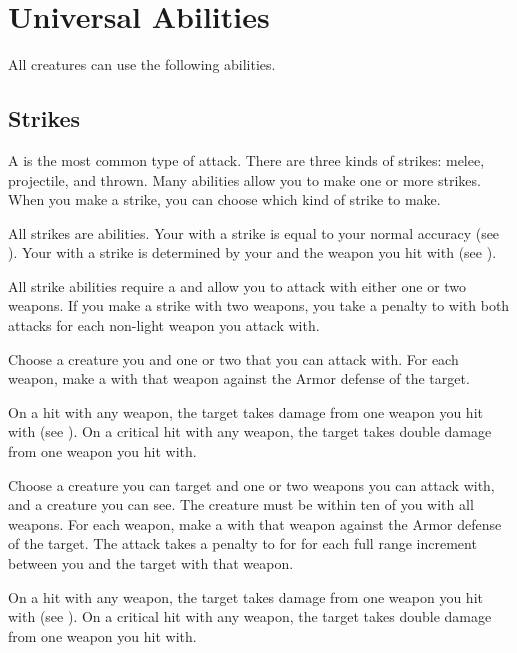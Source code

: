 \section{Universal Abilities}\label{Universal Abilities}
    All creatures can use the following abilities.

    \subsection{Strikes}\label{Strikes}
        A  is the most common type of attack.
        There are three kinds of strikes: melee, projectile, and thrown.
        Many abilities allow you to make one or more strikes.
        When you make a strike, you can choose which kind of strike to make.

        All strikes are  abilities.
        Your  with a strike is equal to your normal accuracy (see ).
        Your  with a strike is determined by your  and the weapon you hit with (see ).

        \label{Two-Weapon Strikes}
        All strike abilities require a  and allow you to attack with either one or two weapons.
        If you make a strike with two weapons, you take a  penalty to  with both attacks for each non-light weapon you attack with.

        \begin{freeability}{}
            Choose a creature you  and one or two  that you can attack with.
            For each weapon, make a  with that weapon against the Armor defense of the target.

            On a hit with any weapon, the target takes damage from one weapon you hit with (see ).
            On a critical hit with any weapon, the target takes double damage from one weapon you hit with.
        \end{freeability}

        \begin{freeability}{}
            Choose a creature you can target and one or two  weapons you can attack with, and a creature you can see.
            The creature must be within ten  of you with all weapons.
            For each weapon, make a  with that weapon against the Armor defense of the target.
            The attack takes a  penalty to  for for each full range increment between you and the target with that weapon.

            On a hit with any weapon, the target takes damage from one weapon you hit with (see ).
            On a critical hit with any weapon, the target takes double damage from one weapon you hit with.
        \end{freeability}

